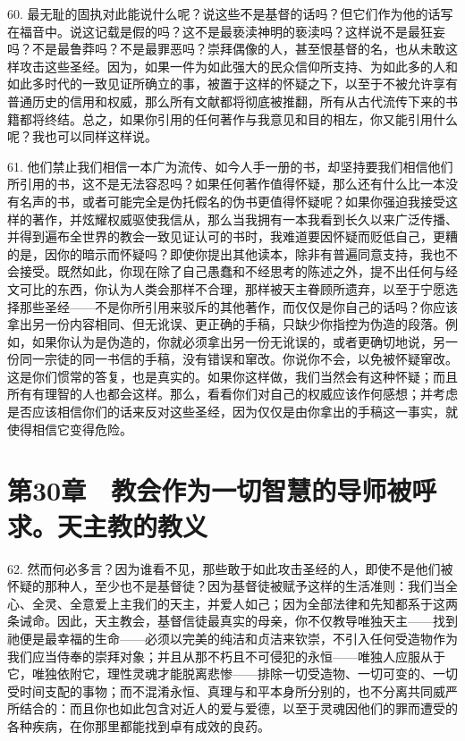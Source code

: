 60. 最无耻的固执对此能说什么呢？说这些不是基督的话吗？但它们作为他的话写在福音中。说这记载是假的吗？这不是最亵渎神明的亵渎吗？这样说不是最狂妄吗？不是最鲁莽吗？不是最罪恶吗？崇拜偶像的人，甚至恨基督的名，也从未敢这样攻击这些圣经。因为，如果一件为如此强大的民众信仰所支持、为如此多的人和如此多时代的一致见证所确立的事，被置于这样的怀疑之下，以至于不被允许享有普通历史的信用和权威，那么所有文献都将彻底被推翻，所有从古代流传下来的书籍都将终结。总之，如果你引用的任何著作与我意见和目的相左，你又能引用什么呢？我也可以同样这样说。\par

61. 他们禁止我们相信一本广为流传、如今人手一册的书，却坚持要我们相信他们所引用的书，这不是无法容忍吗？如果任何著作值得怀疑，那么还有什么比一本没有名声的书，或者可能完全是伪托假名的伪书更值得怀疑呢？如果你强迫我接受这样的著作，并炫耀权威驱使我信从，那么当我拥有一本我看到长久以来广泛传播、并得到遍布全世界的教会一致见证认可的书时，我难道要因怀疑而贬低自己，更糟的是，因你的暗示而怀疑吗？即使你提出其他读本，除非有普遍同意支持，我也不会接受。既然如此，你现在除了自己愚蠢和不经思考的陈述之外，提不出任何与经文可比的东西，你认为人类会那样不合理，那样被天主眷顾所遗弃，以至于宁愿选择那些圣经——不是你所引用来驳斥的其他著作，而仅仅是你自己的话吗？你应该拿出另一份内容相同、但无讹误、更正确的手稿，只缺少你指控为伪造的段落。例如，如果你认为是伪造的，你就必须拿出另一份无讹误的，或者更确切地说，另一份同一宗徒的同一书信的手稿，没有错误和窜改。你说你不会，以免被怀疑窜改。这是你们惯常的答复，也是真实的。如果你这样做，我们当然会有这种怀疑；而且所有有理智的人也都会这样。那么，看看你们对自己的权威应该作何感想；并考虑是否应该相信你们的话来反对这些圣经，因为仅仅是由你拿出的手稿这一事实，就使得相信它变得危险。\par


\section{第30章　教会作为一切智慧的导师被呼求。天主教的教义}

62. 然而何必多言？因为谁看不见，那些敢于如此攻击圣经的人，即使不是他们被怀疑的那种人，至少也不是基督徒？因为基督徒被赋予这样的生活准则：我们当全心、全灵、全意爱上主我们的天主，并爱人如己；因为全部法律和先知都系于这两条诫命。因此，天主教会，基督信徒最真实的母亲，你不仅教导唯独天主——找到祂便是最幸福的生命——必须以完美的纯洁和贞洁来钦崇，不引入任何受造物作为我们应当侍奉的崇拜对象；并且从那不朽且不可侵犯的永恒——唯独人应服从于它，唯独依附它，理性灵魂才能脱离悲惨——排除一切受造物、一切可变的、一切受时间支配的事物；而不混淆永恒、真理与和平本身所分别的，也不分离共同威严所结合的：而且你也如此包含对近人的爱与爱德，以至于灵魂因他们的罪而遭受的各种疾病，在你那里都能找到卓有成效的良药。\par

